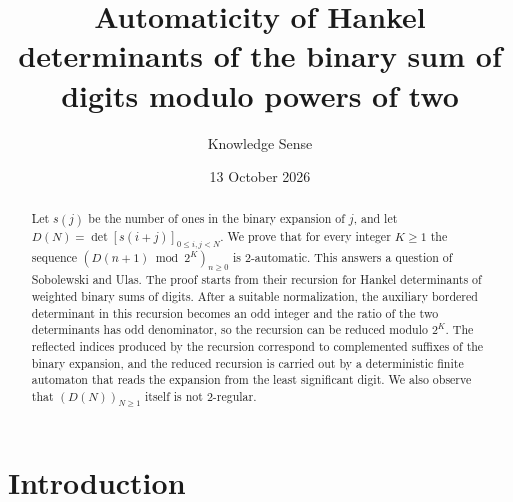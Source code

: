 \documentclass{amsart}
\theoremstyle{definition}
\theoremstyle{remark}
\numberwithin{equation}{section}
\begin{document}
\title[Binary digit-sum Hankel determinants modulo powers of two]{Automaticity of Hankel determinants of the binary sum of digits modulo powers of two}

\author{Knowledge Sense}
\address{Knowledge Sense}

\date{13 October 2026}



\begin{abstract}
Let $s(j)$ be the number of ones in the binary expansion of $j$, and let $D(N)=\det[s(i+j)]_{0\le i,j<N}$. We prove that for every integer $K\ge1$ the sequence $(D(n+1)\bmod 2^K)_{n\ge0}$ is $2$-automatic. This answers a question of Sobolewski and Ulas. The proof starts from their recursion for Hankel determinants of weighted binary sums of digits. After a suitable normalization, the auxiliary bordered determinant in this recursion becomes an odd integer and the ratio of the two determinants has odd denominator, so the recursion can be reduced modulo $2^K$. The reflected indices produced by the recursion correspond to complemented suffixes of the binary expansion, and the reduced recursion is carried out by a deterministic finite automaton that reads the expansion from the least significant digit. We also observe that $(D(N))_{N\ge1}$ itself is not $2$-regular.
\end{abstract}

\maketitle

\section{Introduction}
\end{document}
